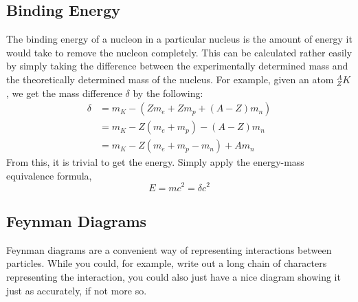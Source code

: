 \documentclass[12pt,a4paper]{report}
\begin{document}
\subsection{Binding Energy}
The binding energy of a nucleon in a particular nucleus is the amount of energy
it would take to remove the nucleon completely. This can be calculated rather
easily by simply taking the difference between the experimentally determined
mass and the theoretically determined mass of the nucleus. For example, given an
atom \(_Z^AK\), we get the mass difference \(\delta\) by the following:
\begin{align*}
  \delta &= m_K - (Zm_e + Zm_p + (A-Z)m_n)\\&= m_K - Z(m_e+m_p) - (A-Z)m_n\\&= m_K -
  Z(m_e+m_p-m_n) + Am_n
\end{align*}
From this, it is trivial to get the energy. Simply apply the energy-mass
equivalence formula,
\[
  E = mc^2 = \delta c^2
\]
\subsection{Feynman Diagrams}
Feynman diagrams are a convenient way of representing interactions between
particles. While you could, for example, write out a long chain of characters
representing the interaction, you could also just have a nice diagram showing it
just as accurately, if not more so.
\end{document}

